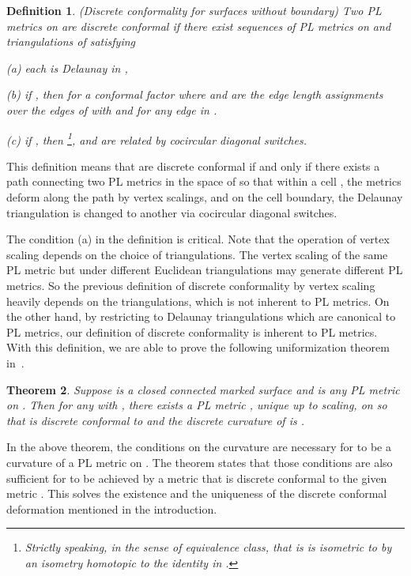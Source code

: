 \documentclass[11pt]{article}
\newtheorem{theorem}{Theorem}[section]
\newtheorem{definition}[theorem]{Definition}
\begin{document}
\begin{definition} \label{dc}(Discrete conformality for surfaces without boundary)
 Two PL metrics  on  are discrete conformal  if there exist sequences
 of PL
metrics  on  and triangulations
 of   satisfying

(a) each  is Delaunay in ,

(b) if , then  for a conformal factor 
where  and  are the edge length assignments over the edges of  with  and 
 for any edge  in . 

(c) if , then \footnote{Strictly speaking, 
 in the sense of equivalence class, that is   is isometric 
to  by an isometry homotopic to the identity in .}, and  are related by cocircular diagonal switches.
\end{definition}
This definition means that  are discrete conformal if and only if there exists a path 
connecting two PL metrics in the space of 
so that within a cell , the metrics deform along the path by vertex scalings, 
and on the cell boundary, the Delaunay triangulation is changed to another
via cocircular diagonal switches.  

The condition (a) in the definition is critical. Note that the operation of vertex scaling 
depends on the choice of triangulations. The vertex scaling of the same PL metric but under different
Euclidean triangulations may generate different PL metrics. So the previous definition of discrete conformality 
by vertex scaling~\cite{Rocek, luo, bps} heavily depends on the triangulations, which is
not inherent to PL metrics. On the other hand, by restricting to Delaunay triangulations which are canonical 
to PL metrics, our definition of discrete conformality is inherent to PL metrics. With this definition, 
we are able to prove the following uniformization theorem in~\cite{glsw1}. 

\begin{theorem} \label{thm:main} Suppose  is a closed connected marked surface
and   is any PL metric on .  Then for any  with , there
exists a PL metric , unique up to scaling,  on  so
that  is discrete conformal to  and the discrete curvature
of  is . 
\end{theorem}
In the above theorem, the conditions on the curvature  are necessary for
 to be a curvature of a PL metric on . The theorem states that those conditions are 
also sufficient for  to be achieved by a metric that is discrete conformal to the given
metric . This solves the existence and the uniqueness of the discrete conformal deformation 
mentioned in the introduction.
\end{document}
